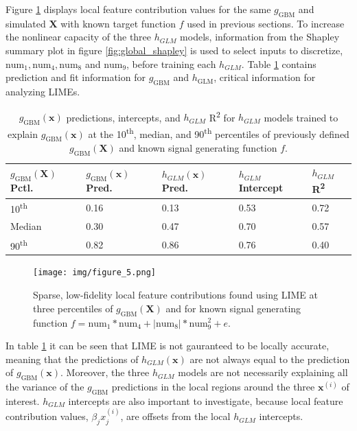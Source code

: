 \documentclass{article}
\begin{document}
Figure \ref{fig:lime} displays local feature contribution values for the same $g_{\text{GBM}}$ and simulated $\mathbf{X}$ with known target function $f$ used in previous sections. To increase the nonlinear capacity of the three $h_{GLM}$ models, information from the Shapley summary plot in figure \ref{fig:global_shapley} is used to select inputs to discretize, $\text{num}_1, \text{num}_4, \text{num}_8$ and $\text{num}_9$, before training each $h_{GLM}$. Table \ref{tab:lime} contains prediction and fit information for $g_{\text{GBM}}$ and $h_{\text{GLM}}$, critical information for analyzing LIMEs.

\vspace{-10pt}
\begin{table}[ht]
	\caption{$g_{\text{GBM}}(\mathbf{x})$ predictions, intercepts, and $h_{GLM}$ R\textsuperscript{2} for $h_{GLM}$ models trained to explain $g_{\text{GBM}}(\mathbf{x})$ at the 10\textsuperscript{th}, median, and 90\textsuperscript{th} percentiles of previously defined $g_{\text{GBM}}(\mathbf{X})$ and known signal generating function $f$.} 
	\begin{tabular}{ | p{1.4cm} | p{1.4cm} | p{1.4cm} | p{1.4cm}| p{0.8cm} | }
	\hline
	$g_{\text{GBM}}(\mathbf{X})$ Pctl. & $g_{\text{GBM}}(\mathbf{x})$ Pred. & $h_{GLM}(\mathbf{x})$ Pred. & $h_{GLM}$ Intercept & $h_{GLM}$ R\textsuperscript{2} \\ 
	\hline
	10\textsuperscript{th} & 0.16 & 0.13 & 0.53 & 0.72\\
	\hline	
	Median & 0.30 & 0.47 & 0.70 & 0.57\\
	\hline	
	90\textsuperscript{th} & 0.82 & 0.86 & 0.76 & 0.40\\
	\hline
	\end{tabular}
	\label{tab:lime}
\end{table}	

\begin{figure}[htb]
	\begin{center}
		\texttt{[image: img/figure\_5.png]}
		\caption{Sparse, low-fidelity local feature contributions found using LIME at three percentiles of $g_{\text{GBM}}(\mathbf{X})$ and for known signal generating function $f = \text{num} _1 * \text{num}_4 + |\text{num}_8| * \text{num}_9^2 + e$.}
		\label{fig:lime}
	\end{center}
\end{figure}

In table \ref{tab:lime} it can be seen that LIME is not gauranteed to be locally accurate, meaning that the predictions of $h_{GLM}(\mathbf{x})$ are not always equal to the prediction of $g_{\text{GBM}}(\mathbf{x})$. Moreover, the three $h_{GLM}$ models are not necessarily explaining all the variance of the $g_{\text{GBM}}$ predictions in the local regions around the three $\mathbf{x}^{(i)}$ of interest. $h_{GLM}$ intercepts are also important to investigate, because local feature contribution values, $\beta_j x_j^{(i)}$, are offsets from the local $h_{GLM}$ intercepts.
\end{document}
